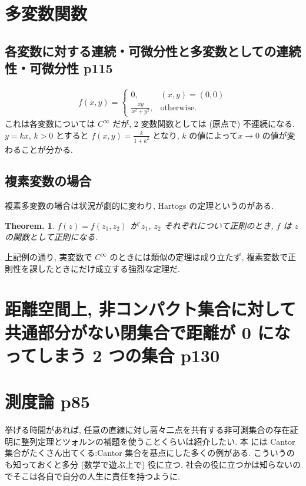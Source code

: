 \documentclass[openany, a4paper, oneside]{jsbook}
\theoremstyle{break}
\newtheorem{thm}{Theorem.}[section]
\theoremstyle{breakdefn}
\begin{document}
\section{多変数関数}

\subsection{各変数に対する連続・可微分性と多変数としての連続性・可微分性 \cite{GelbaumOlmsted1} p115}


\begin{align}
 f (x, y)
 =
 \begin{cases}
  0,                  & (x, y) = (0, 0) \\
  \frac{xy}{x^2+y^2}, & \mathrm{otherwise}.
 \end{cases}
\end{align}
これは各変数については $C^{\infty}$ だが, 2 変数関数としては (原点で) 不連続になる.
$y = k x$, $k > 0$ とすると $f (x, y) = \frac{k}{1 + k^2}$ となり, $k$ の値によって$x \to 0$ の値が変わることが分かる.
\subsection{複素変数の場合}


複素多変数の場合は状況が劇的に変わり, Hartogs の定理というのがある.
\begin{thm}
 $f (z) = f (z_1, z_2)$ が $z_1$, $z_2$ それぞれについて正則のとき, $f$ は $z$ の関数として正則になる.
\end{thm}
上記例の通り, 実変数で $C^{\infty}$ のときには類似の定理は成り立たず, 複素変数で正則性を課したときにだけ成立する強烈な定理だ.
\section{距離空間上, 非コンパクト集合に対して共通部分がない閉集合で距離が 0 になってしまう 2 つの集合 \cite{GelbaumOlmsted1} p130}

\section{測度論 \cite{GelbaumOlmsted1} p85}


挙げる時間があれば, 任意の直線に対し高々二点を共有する非可測集合の存在証明に整列定理とツォルンの補題を使うことくらいは紹介したい.
本 \cite{GelbaumOlmsted1} には Cantor 集合がたくさん出てくる:Cantor 集合を基点にした多くの例がある.
こういうのも知っておくと多分 (数学で遊ぶ上で) 役に立つ.
社会の役に立つかは知らないのでそこは各自で自分の人生に責任を持つように.
\end{document}
